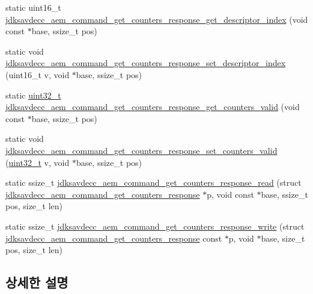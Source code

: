 \begin{DoxyCompactItemize}
\item 
static uint16\+\_\+t \hyperlink{group__command__get__counters__response_gaa74bdfb514c2df95488fd804f59113e5}{jdksavdecc\+\_\+aem\+\_\+command\+\_\+get\+\_\+counters\+\_\+response\+\_\+get\+\_\+descriptor\+\_\+index} (void const $\ast$base, ssize\+\_\+t pos)
\item 
static void \hyperlink{group__command__get__counters__response_gabedf5ed3413d80135de8c2b624c93495}{jdksavdecc\+\_\+aem\+\_\+command\+\_\+get\+\_\+counters\+\_\+response\+\_\+set\+\_\+descriptor\+\_\+index} (uint16\+\_\+t v, void $\ast$base, ssize\+\_\+t pos)
\item 
static \hyperlink{parse_8c_a6eb1e68cc391dd753bc8ce896dbb8315}{uint32\+\_\+t} \hyperlink{group__command__get__counters__response_gafe2cdaefe9d73a9be578e3d8cc2723eb}{jdksavdecc\+\_\+aem\+\_\+command\+\_\+get\+\_\+counters\+\_\+response\+\_\+get\+\_\+counters\+\_\+valid} (void const $\ast$base, ssize\+\_\+t pos)
\item 
static void \hyperlink{group__command__get__counters__response_ga5e6f4c2c53bb8b5c86505ae6101932b1}{jdksavdecc\+\_\+aem\+\_\+command\+\_\+get\+\_\+counters\+\_\+response\+\_\+set\+\_\+counters\+\_\+valid} (\hyperlink{parse_8c_a6eb1e68cc391dd753bc8ce896dbb8315}{uint32\+\_\+t} v, void $\ast$base, ssize\+\_\+t pos)
\item 
static ssize\+\_\+t \hyperlink{group__command__get__counters__response_gacf145828e1039af292f7cdb5b8231d65}{jdksavdecc\+\_\+aem\+\_\+command\+\_\+get\+\_\+counters\+\_\+response\+\_\+read} (struct \hyperlink{structjdksavdecc__aem__command__get__counters__response}{jdksavdecc\+\_\+aem\+\_\+command\+\_\+get\+\_\+counters\+\_\+response} $\ast$p, void const $\ast$base, ssize\+\_\+t pos, size\+\_\+t len)
\item 
static ssize\+\_\+t \hyperlink{group__command__get__counters__response_ga3d7420bebd3faa004016d74996ca156e}{jdksavdecc\+\_\+aem\+\_\+command\+\_\+get\+\_\+counters\+\_\+response\+\_\+write} (struct \hyperlink{structjdksavdecc__aem__command__get__counters__response}{jdksavdecc\+\_\+aem\+\_\+command\+\_\+get\+\_\+counters\+\_\+response} const $\ast$p, void $\ast$base, size\+\_\+t pos, size\+\_\+t len)
\end{DoxyCompactItemize}


\subsection{상세한 설명}


